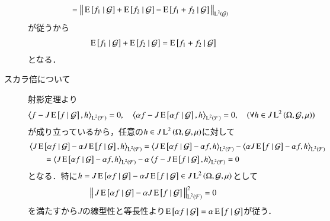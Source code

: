 \begin{prf}
\begin{description}
\begin{description}
\begin{align}
							&= \left\|\, \operatorname{E} \left[ f_1 \ \middle|\ \mathcal{G} \right] + \operatorname{E} \left[ f_2 \ \middle|\ \mathcal{G} \right] - \operatorname{E} \left[ f_1 + f_2 \ \middle|\ \mathcal{G} \right]\, \right\|_{\operatorname{L}^{2} \left(\mathcal{G}\right)}
						\end{align}
						が従うから
						\begin{align}
							\operatorname{E} \left[ f_1 \ \middle|\ \mathcal{G} \right] + \operatorname{E} \left[ f_2 \ \middle|\ \mathcal{G} \right] = \operatorname{E} \left[ f_1 + f_2 \ \middle|\ \mathcal{G} \right]
						\end{align}
						となる．
					\item[スカラ倍について]
						射影定理より
							\begin{align}
								\inprod<f - J\cexp{f}{\mathcal{G}}, h>_{\Lp{2}{\mathcal{F}}} = 0, \quad \inprod<\alpha f - J\cexp{\alpha f}{\mathcal{G}}, h>_{\Lp{2}{\mathcal{F}}} = 0,
								\quad (\forall h \in J\Lp{2}{\Omega, \mathcal{G},\mu})
							\end{align}
							が成り立っているから，任意の$h \in J\operatorname{L}^{2} \left(\Omega, \mathcal{G},\mu\right)$に対して
							\begin{align}
								&\inprod<J\cexp{\alpha f}{\mathcal{G}} - \alpha J\cexp{f}{\mathcal{G}}, h>_{\Lp{2}{\mathcal{F}}}
								= \inprod<J\cexp{\alpha f}{\mathcal{G}} - \alpha f, h>_{\Lp{2}{\mathcal{F}}} - \inprod<\alpha J\cexp{f}{\mathcal{G}} - \alpha f, h>_{\Lp{2}{\mathcal{F}}} \\
								&\qquad= \inprod<J\cexp{\alpha f}{\mathcal{G}} - \alpha f, h>_{\Lp{2}{\mathcal{F}}} - \alpha \inprod<f - J\cexp{f}{\mathcal{G}}, h>_{\Lp{2}{\mathcal{F}}}
								= 0
							\end{align}
							となる．特に$h = J\operatorname{E} \left[ \alpha f \ \middle|\ \mathcal{G} \right] - \alpha J\operatorname{E} \left[ f \ \middle|\ \mathcal{G} \right] \in J\operatorname{L}^{2} \left(\Omega, \mathcal{G},\mu\right)$として
							\begin{align}
								\left\|\, J\operatorname{E} \left[ \alpha f \ \middle|\ \mathcal{G} \right] - \alpha J\operatorname{E} \left[ f \ \middle|\ \mathcal{G} \right]\, \right\|_{\operatorname{L}^{2} \left(\mathcal{F}\right)}^2 = 0
							\end{align}
							を満たすから$J$の線型性と等長性より$\operatorname{E} \left[ \alpha f \ \middle|\ \mathcal{G} \right] = \alpha \operatorname{E} \left[ f \ \middle|\ \mathcal{G} \right]$が従う．
				\end{description}
				

\end{description}
\end{prf}
